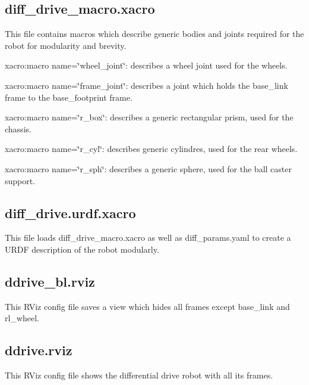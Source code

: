 \subsection*{diff\+\_\+drive\+\_\+macro.\+xacro}

This file contains {\ttfamily macros} which describe generic bodies and joints required for the robot for modularity and brevity.


\begin{DoxyItemize}
\item {\ttfamily xacro\+:macro name=\char`\"{}wheel\+\_\+joint\char`\"{}}\+: describes a wheel joint used for the wheels.
\item {\ttfamily xacro\+:macro name=\char`\"{}frame\+\_\+joint\char`\"{}}\+: describes a joint which holds the {\ttfamily base\+\_\+link} frame to the {\ttfamily base\+\_\+footprint} frame.
\item {\ttfamily xacro\+:macro name=\char`\"{}r\+\_\+box\char`\"{}}\+: describes a generic rectangular prism, used for the chassis.
\item {\ttfamily xacro\+:macro name=\char`\"{}r\+\_\+cyl\char`\"{}}\+: describes generic cylindres, used for the rear wheels.
\item {\ttfamily xacro\+:macro name=\char`\"{}r\+\_\+sph\char`\"{}}\+: describes a generic sphere, used for the ball caster support.
\end{DoxyItemize}

\subsection*{diff\+\_\+drive.\+urdf.\+xacro}

This file loads {\ttfamily diff\+\_\+drive\+\_\+macro.\+xacro} as well as {\ttfamily diff\+\_\+params.\+yaml} to create a {\ttfamily U\+R\+DF} description of the robot modularly.

\subsection*{ddrive\+\_\+bl.\+rviz}

This {\ttfamily R\+Viz} config file saves a view which hides all frames except {\ttfamily base\+\_\+link} and {\ttfamily rl\+\_\+wheel}.

\subsection*{ddrive.\+rviz}

This {\ttfamily R\+Viz} config file shows the differential drive robot with all its frames.


